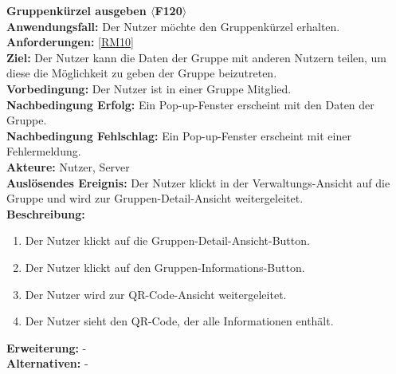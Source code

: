 \documentclass[parskip=full]{scrartcl}
\begin{document}
\textbf{Gruppenkürzel ausgeben $\langle$F120$\rangle$}\\
\textbf{Anwendungsfall:} Der Nutzer möchte den Gruppenkürzel erhalten.\\
\textbf{Anforderungen:} \ref{RM10}\\
\textbf{Ziel:} Der Nutzer kann die Daten der Gruppe mit anderen Nutzern teilen, um diese die Möglichkeit zu geben der Gruppe beizutreten.\\
\textbf{Vorbedingung:} Der Nutzer ist in einer Gruppe Mitglied.\\
\textbf{Nachbedingung Erfolg:} Ein Pop-up-Fenster erscheint mit den Daten der Gruppe.\\
\textbf{Nachbedingung Fehlschlag:} Ein Pop-up-Fenster erscheint mit einer Fehlermeldung.\\
\textbf{Akteure:} Nutzer, Server \\
\textbf{Auslösendes Ereignis:} Der Nutzer klickt in der Verwaltungs-Ansicht auf die Gruppe und wird zur Gruppen-Detail-Ansicht weitergeleitet.\\
\textbf{Beschreibung:}
\begin{enumerate}
    \item Der Nutzer klickt auf die Gruppen-Detail-Ansicht-Button.
    \item Der Nutzer klickt auf den Gruppen-Informations-Button.
    \item Der Nutzer wird zur QR-Code-Ansicht weitergeleitet.
    \item Der Nutzer sieht den QR-Code, der alle Informationen enthält.
\end{enumerate}
\textbf{Erweiterung:} -\\
\textbf{Alternativen:} -\\
\newpage
\end{document}
